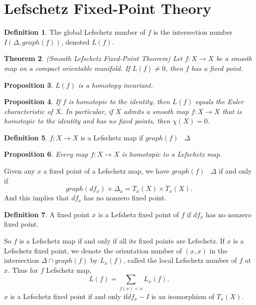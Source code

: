 \documentclass[psamsfonts]{amsart}
\newtheorem{theorem}{Theorem}[section]
\newtheorem{prop}[theorem]{Proposition}
\theoremstyle{definition}
\newtheorem{defn}[theorem]{Definition}
\theoremstyle{remark}
\numberwithin{equation}{section}
\begin{document}
	\section{Lefschetz Fixed-Point Theory}
		\begin{defn}
			The global Lefschetz number of $f$ is the intersection number $I(\Delta, graph(f))$, denoted $L(f)$.
		\end{defn}
		\begin{theorem}(Smooth Lefschetz Fixed-Point Theorem)
			Let $f:X \to X$ be a smooth map on a compact orientable manifold. If $L(f) \neq 0$, then $f$ has a fixed point.			
		\end{theorem}
		\begin{prop}
			$L(f)$ is a homotopy invariant.
		\end{prop}
		\begin{prop}
			If $f$ is homotopic to the identity, then $L(f)$ equals the Euler characteristic of $X$. In particular, if $X$ admits a smooth map $f: X \to X$ that is homotopic to the identity and has no fixed points, then $\chi(X) = 0$.
		\end{prop}
		\begin{defn}
			$f: X \to X$ is a Lefschetz map if $graph(f)$ \;\;\makebox[0pt]{$\top$}\makebox[0pt]{$\cap$}\;\ $\Delta$
		\end{defn}
		\begin{prop}
			Every map $f: X \to X$ is homotopic to a Lefschetz map.
		\end{prop}
		Given any $x$ a fixed point of a Lefschetz map, we have $graph(f)$ \;\;\makebox[0pt]{$\top$}\makebox[0pt]{$\cap$}\;\ $\Delta$ if and only if
		\begin{equation}
			graph(df_x) + \Delta_x = T_x(X) \times T_x(X).
		\end{equation}
		And this implies that $df_x$ has no nonzero fixed point.
		\begin{defn}
			A fixed point $x$ is a Lefshetz fixed point of $f$ if $df_x$ has no nonzero fixed point.
		\end{defn}
		So $f$ is a Lefschetz map if and only if all its fixed points are Lefschetz. If $x$ is a Lefschetz fixed point, we denote the orientation number of $(x,x)$ in the intersection $\Delta \cap graph(f)$ by $L_x(f)$, called the local Lefschetz number of $f$ at $x$. Thus for $f$ Lefschetz map,
		\begin{equation}
			L(f) = \sum_{f(x)=x}L_x(f).
		\end{equation}
		$x$ is a Lefschetz fixed point if and only if$df_x - I$ is an isomorphism of $T_x(X)$.
\end{document}
